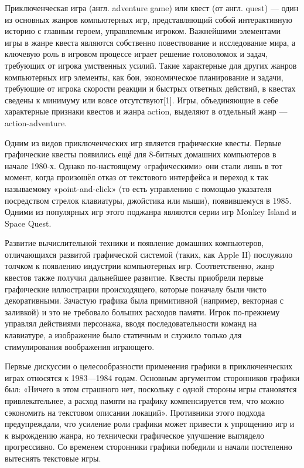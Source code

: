 Приключенческая игра (англ. adventure game) или квест (от англ. quest) — один из основных жанров компьютерных игр, представляющий собой интерактивную историю с главным героем, управляемым игроком. Важнейшими элементами игры в жанре квеста являются собственно повествование и исследование мира, а ключевую роль в игровом процессе играет решение головоломок и задач, требующих от игрока умственных усилий. Такие характерные для других жанров компьютерных игр элементы, как бои, экономическое планирование и задачи, требующие от игрока скорости реакции и быстрых ответных действий, в квестах сведены к минимуму или вовсе отсутствуют[1]. Игры, объединяющие в себе характерные признаки квестов и жанра action, выделяют в отдельный жанр — action-adventure.

Одним из видов приключенческих игр является графические квесты. Первые графические квесты появились ещё для 8-битных домашних компьютеров в начале 1980-х. Однако по-настоящему «графическими» они стали лишь в тот момент, когда произошёл отказ от текстового интерфейса и переход к так называемому «point-and-click» (то есть управлению с помощью указателя посредством стрелок клавиатуры, джойстика или мыши), появившемуся в 1985. Одними из популярных игр этого поджанра являются серии игр Monkey Island и Space Quest.

Развитие вычислительной техники и появление домашних компьютеров, отличающихся развитой графической системой (таких, как Apple II) послужило толчком к появлению индустрии компьютерных игр. Соответственно, жанр квестов также получил дальнейшее развитие. Квесты приобрели первые графические иллюстрации происходящего, которые поначалу были чисто декоративными. Зачастую графика была примитивной (например, векторная с заливкой) и это не требовало больших расходов памяти. Игрок по-прежнему управлял действиями персонажа, вводя последовательности команд на клавиатуре, а изображение было статичным и служило только для стимулирования воображения играющего.

Первые дискуссии о целесообразности применения графики в приключенческих играх относятся к 1983—1984 годам. Основным аргументом сторонников графики был: «Ничего в этом страшного нет, поскольку с одной стороны игры становятся привлекательнее, а расход памяти на графику компенсируется тем, что можно сэкономить на текстовом описании локаций». Противники этого подхода предупреждали, что усиление роли графики может привести к упрощению игр и к вырождению жанра, но технически графическое улучшение выглядело прогрессивно. Со временем сторонники графики победили и начали постепенно вытеснять текстовые игры.

